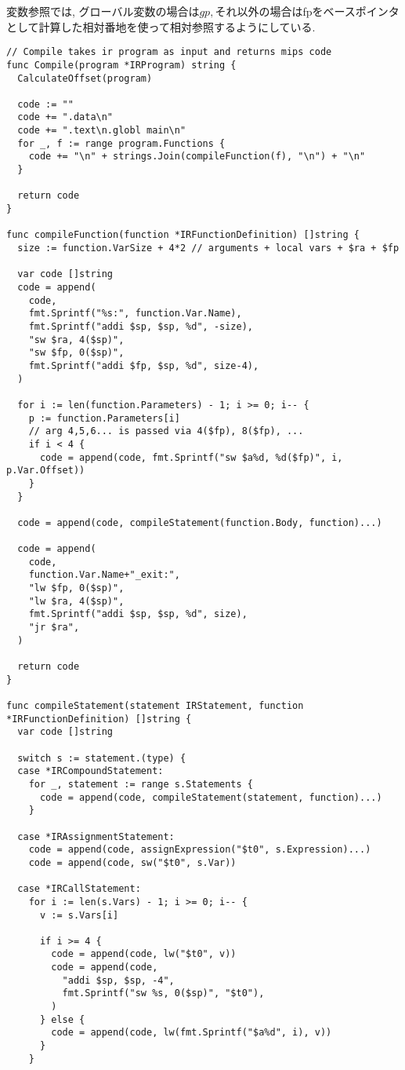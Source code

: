 \documentclass[a4j]{jarticle}
\begin{document}
変数参照では, グローバル変数の場合は$gp, それ以外の場合は$fpをベースポインタとして計算した相対番地を使って相対参照するようにしている.

\begin{verbatim}
// Compile takes ir program as input and returns mips code
func Compile(program *IRProgram) string {
  CalculateOffset(program)

  code := ""
  code += ".data\n"
  code += ".text\n.globl main\n"
  for _, f := range program.Functions {
    code += "\n" + strings.Join(compileFunction(f), "\n") + "\n"
  }

  return code
}

func compileFunction(function *IRFunctionDefinition) []string {
  size := function.VarSize + 4*2 // arguments + local vars + $ra + $fp

  var code []string
  code = append(
    code,
    fmt.Sprintf("%s:", function.Var.Name),
    fmt.Sprintf("addi $sp, $sp, %d", -size),
    "sw $ra, 4($sp)",
    "sw $fp, 0($sp)",
    fmt.Sprintf("addi $fp, $sp, %d", size-4),
  )

  for i := len(function.Parameters) - 1; i >= 0; i-- {
    p := function.Parameters[i]
    // arg 4,5,6... is passed via 4($fp), 8($fp), ...
    if i < 4 {
      code = append(code, fmt.Sprintf("sw $a%d, %d($fp)", i, p.Var.Offset))
    }
  }

  code = append(code, compileStatement(function.Body, function)...)

  code = append(
    code,
    function.Var.Name+"_exit:",
    "lw $fp, 0($sp)",
    "lw $ra, 4($sp)",
    fmt.Sprintf("addi $sp, $sp, %d", size),
    "jr $ra",
  )

  return code
}

func compileStatement(statement IRStatement, function *IRFunctionDefinition) []string {
  var code []string

  switch s := statement.(type) {
  case *IRCompoundStatement:
    for _, statement := range s.Statements {
      code = append(code, compileStatement(statement, function)...)
    }

  case *IRAssignmentStatement:
    code = append(code, assignExpression("$t0", s.Expression)...)
    code = append(code, sw("$t0", s.Var))

  case *IRCallStatement:
    for i := len(s.Vars) - 1; i >= 0; i-- {
      v := s.Vars[i]

      if i >= 4 {
        code = append(code, lw("$t0", v))
        code = append(code,
          "addi $sp, $sp, -4",
          fmt.Sprintf("sw %s, 0($sp)", "$t0"),
        )
      } else {
        code = append(code, lw(fmt.Sprintf("$a%d", i), v))
      }
    }


\end{verbatim}
\end{document}
